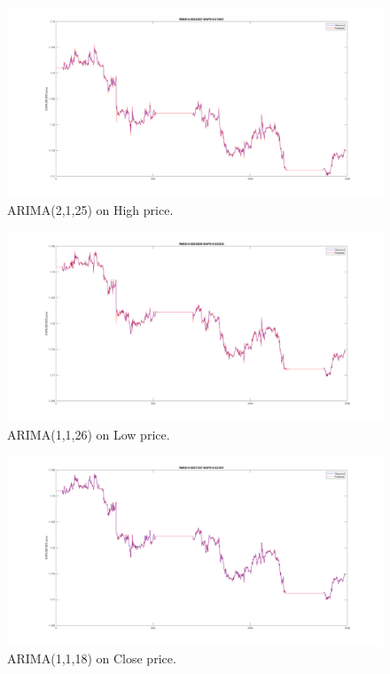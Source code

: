 \documentclass[11pt]{article}
\begin{document}
\begin{figure}[H]
  \centering
  \includegraphics[width=\linewidth,keepaspectratio]{figs/arima_2_1_25_high.png}
  \caption{ARIMA(2,1,25) on High price.}
\end{figure}

\begin{figure}[H]
  \centering
  \includegraphics[width=\linewidth,keepaspectratio]{figs/arima_26_1_1_low.png}
  \caption{ARIMA(1,1,26) on Low price.}
\end{figure}

\begin{figure}[H]
  \centering
  \includegraphics[width=\linewidth,keepaspectratio]{figs/arima_1_1_18_close.png}
  \caption{ARIMA(1,1,18) on Close price.}
\end{figure}
\end{document}
